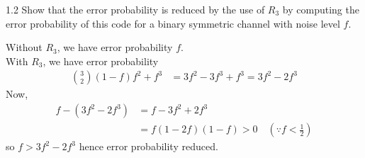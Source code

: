 \documentclass[12pt, a4paper]{article}
\begin{document}
\begin{prob}{1.2}
Show that the error probability is reduced by the use of
$R_{3}$ by computing the error probability of this code for a binary symmetric
channel with noise level $f$.
\end{prob}

\begin{sol}
\noindent Without $R_{3}$, we have error probability $f$. \\
With $R_{3}$, we have error probability
\begin{align*}
\binom{3}{2} (1-f)f^2 + f^3 &= 3f^2 - 3f^3 + f^3 = 3f^2 - 2f^3
\end{align*}
Now, 
\begin{align*}
f - (3f^2 - 2f^3) &= f - 3f^2 + 2f^3 \\
                &= f(1-2f)(1-f) > 0  \quad (\because f < \frac{1}{2})
\end{align*}
so $f > 3f^2 - 2f^3$ hence error probability reduced.
\end{sol}
\bigskip
\end{document}
